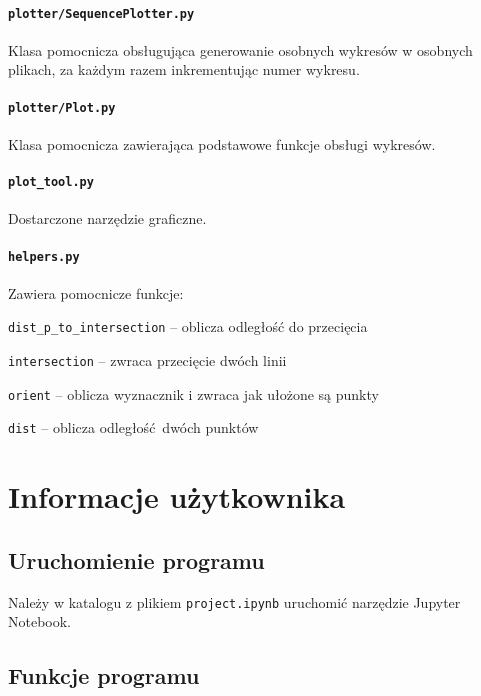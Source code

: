 \documentclass[12pt]{article}
\let\tempone\itemize
\let\temptwo\enditemize
\renewenvironment{itemize}{\tempone\setlength{\itemsep}{0cm}}{\temptwo}
\begin{document}
		\paragraph{\lstinline|plotter/SequencePlotter.py|}
			Klasa pomocnicza obsługująca generowanie osobnych wykresów w osobnych plikach, za każdym razem inkrementując numer wykresu.

		\paragraph{\lstinline|plotter/Plot.py|}
			Klasa pomocnicza zawierająca podstawowe funkcje obsługi wykresów.

		\paragraph{\lstinline|plot_tool.py|}
			Dostarczone narzędzie graficzne.
			
		\paragraph{\lstinline|helpers.py|}
			Zawiera pomocnicze funkcje:
			\begin{itemize}
				\item \lstinline|dist_p_to_intersection| -- oblicza odległość do przecięcia
				\item \lstinline|intersection| -- zwraca przecięcie dwóch linii
				\item \lstinline|orient| -- oblicza wyznacznik i zwraca jak ułożone są punkty 
				\item \lstinline|dist| -- oblicza odległość dwóch punktów
			\end{itemize}
	
	\section{Informacje użytkownika}
	
	\subsection{Uruchomienie programu}
		Należy w katalogu z plikiem \lstinline|project.ipynb| uruchomić narzędzie Jupyter Notebook.
	
	\subsection{Funkcje programu}
	
\end{document}
